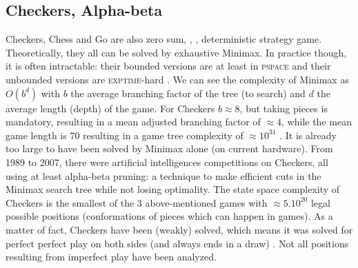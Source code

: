 \subsection{Checkers, Alpha-beta}
Checkers, Chess and Go are also zero sum, , , deterministic strategy game. Theoretically, they all can be solved by exhaustive Minimax. 
In practice though, it is often intractable: their bounded versions are at least in \textsc{pspace} and their unbounded versions are \textsc{exptime}-hard \citep{GPC}. We can see the complexity of Minimax as $O(b^d)$ with $b$ the average branching factor of the tree (to search) and $d$ the average length (depth) of the game. 
For Checkers $b \approx 8$, but taking pieces is mandatory, resulting in a mean adjusted branching factor of $\approx 4$, while the mean game length is 70 resulting in a game tree complexity of $\approx 10^{31}$ \citep{allis1994}. It is already too large to have been solved by Minimax alone (on current hardware). From 1989 to 2007, there were artificial intelligences competitions on Checkers, all using at least alpha-beta pruning: a technique to make efficient cuts in the Minimax search tree while not losing optimality. 
The state space complexity of Checkers is the smallest of the 3 above-mentioned games with $\approx 5.10^{20}$ legal possible positions (conformations of pieces which can happen in games). As a matter of fact, Checkers have been (weakly) solved, which means it was solved for perfect perfect play on both sides (and always ends in a draw) \citep{Schaeffer07}. Not all positions resulting from imperfect play have been analyzed. 


